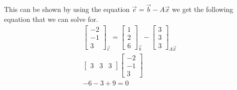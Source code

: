 				This can be shown by using the equation $\vec{e}=\vec{b}-A\vec{x}$ we get the following equation that we can solve for. \newline
				\begin{gather*}
				    \begin{bmatrix}
				    -2 \\ -1 \\ 3
				    \end{bmatrix}_{\vec{e}}
				    =
				     \begin{bmatrix}
				    1 \\ 2 \\ 6
				    \end{bmatrix}_{\vec{b}}
				    -
				     \begin{bmatrix}
				    3 \\ 3 \\ 3
				    \end{bmatrix}_{A\vec{x}}
				  \\
				    \begin{bmatrix}
				    3 & 3 & 3
				    \end{bmatrix}
				    \begin{bmatrix}
				    -2 \\ -1 \\ 3    
				    \end{bmatrix}
				   \\
				    -6-3+9=0
				\end{gather*}